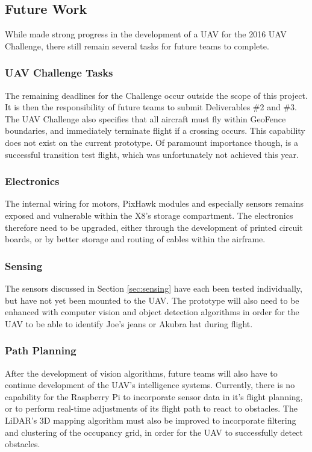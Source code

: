 \subsection{Future Work}
While \ID made strong progress in the development of a UAV for the 2016 UAV Challenge, there still remain several tasks for future teams to complete.

\subsubsection*{UAV Challenge Tasks}
The remaining deadlines for the Challenge occur outside the scope of this project. It is then the responsibility of future teams to submit Deliverables \#2 and \#3. The UAV Challenge also specifies that all aircraft must fly within GeoFence boundaries, and immediately terminate flight if a crossing occurs. This capability does not exist on the current prototype. Of paramount importance though, is a successful transition test flight, which was unfortunately not achieved this year.

\subsubsection*{Electronics}
The internal wiring for motors, PixHawk modules and especially sensors remains exposed and vulnerable within the X8's storage compartment. The electronics therefore need to be upgraded, either through the development of printed circuit boards, or by better storage and routing of cables within the airframe.

\subsubsection*{Sensing}
The sensors discussed in Section \ref{sec:sensing} have each been tested individually, but have not yet been mounted to the UAV. The prototype will also need to be enhanced with computer vision and object detection algorithms in order for the UAV to be able to identify Joe's jeans or Akubra hat during flight.

\subsubsection*{Path Planning}
After the development of vision algorithms, future teams will also have to continue development of the UAV's intelligence systems. Currently, there is no capability for the Raspberry Pi to incorporate sensor data in it's flight planning, or to perform real-time adjustments of its flight path to react to obstacles. The LiDAR's 3D mapping algorithm must also be improved to incorporate filtering and clustering of the occupancy grid, in order for the UAV to successfully detect obstacles.
